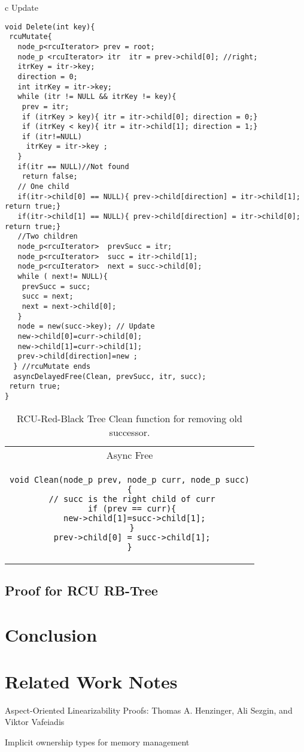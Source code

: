 \begin{table}[]
	\begin{tabular}{ c }
		Update\\		
\begin{lstlisting}
void Delete(int key){  
 rcuMutate{  
   node_p<rcuIterator> prev = root;
   node_p <rcuIterator> itr  itr = prev->child[0]; //right;
   itrKey = itr->key;
   direction = 0;
   int itrKey = itr->key;  
   while (itr != NULL && itrKey != key){
    prev = itr;
    if (itrKey > key){ itr = itr->child[0]; direction = 0;}
    if (itrKey < key){ itr = itr->child[1]; direction = 1;}
    if (itr!=NULL) 
     itrKey = itr->key ;
   }
   if(itr == NULL)//Not found
    return false;
   // One child
   if(itr->child[0] == NULL){ prev->child[direction] = itr->child[1]; return true;}
   if(itr->child[1] == NULL){ prev->child[direction] = itr->child[0]; return true;}
   //Two children
   node_p<rcuIterator>  prevSucc = itr;  
   node_p<rcuIterator>  succ = itr->child[1];
   node_p<rcuIterator>  next = succ->child[0]; 
   while ( next!= NULL){
    prevSucc = succ;
    succ = next;
    next = next->child[0];
   }
   node = new(succ->key); // Update
   new->child[0]=curr->child[0];
   new->child[1]=curr->child[1];
   prev->child[direction]=new ;    
  } //rcuMutate ends
  asyncDelayedFree(Clean, prevSucc, itr, succ);   
 return true;
}
\end{lstlisting} 
	\end{tabular} \hfill	
\caption{RCU-Red-Black Tree Delete implementation.}
\label{tab:rcurbtreedel}
\end{table}
\begin{table}[]
	\begin{tabular}{ c }
		Async Free\\
\begin{lstlisting}
void Clean(node_p prev, node_p curr, node_p succ)
{
 // succ is the right child of curr
 if (prev == curr){
  new->child[1]=succ->child[1];
 }
 prev->child[0] = succ->child[1];
}
\end{lstlisting}
	\end{tabular} \hfill	
\caption{RCU-Red-Black Tree Clean function for removing old successor.}
\label{tab:rcurbtreecln}
\end{table}
\subsection{Proof for RCU RB-Tree}
\section{Conclusion}
\section{Related Work Notes}
Aspect-Oriented Linearizability Proofs:
Thomas A. Henzinger, Ali Sezgin, and Viktor Vafeiadis


Implicit ownership types for memory management
